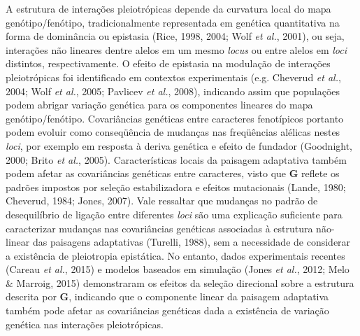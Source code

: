 \documentclass[12pt,twoside]{report}
\begin{document}
A estrutura de interações pleiotrópicas depende da curvatura local do
mapa genótipo/fenótipo, tradicionalmente representada em genética
quantitativa na forma de dominância ou epistasia (Rice, 1998, 2004; Wolf
\emph{et al.}, 2001), ou seja, interações não lineares dentre alelos em
um mesmo \emph{locus} ou entre alelos em \emph{loci} distintos,
respectivamente. O efeito de epistasia na modulação de interações
pleiotrópicas foi identificado em contextos experimentais (e.g. Cheverud
\emph{et al.}, 2004; Wolf \emph{et al.}, 2005; Pavlicev \emph{et al.},
2008), indicando assim que populações podem abrigar variação genética
para os componentes lineares do mapa genótipo/fenótipo. Covariâncias
genéticas entre caracteres fenotípicos portanto podem evoluir como
conseqüência de mudanças nas freqüências alélicas nestes \emph{loci},
por exemplo em resposta à deriva genética e efeito de fundador
(Goodnight, 2000; Brito \emph{et al.}, 2005). Características locais da
paisagem adaptativa também podem afetar as covariâncias genéticas entre
caracteres, visto que $\mathbf{G}$ reflete os padrões impostos por
seleção estabilizadora e efeitos mutacionais (Lande, 1980; Cheverud,
1984; Jones, 2007). Vale ressaltar que mudanças no padrão de
desequilíbrio de ligação entre diferentes \emph{loci} são uma explicação
suficiente para caracterizar mudanças nas covariâncias genéticas
associadas à estrutura não-linear das paisagens adaptativas (Turelli,
1988), sem a necessidade de considerar a existência de pleiotropia
epistática. No entanto, dados experimentais recentes (Careau \emph{et
al.}, 2015) e modelos baseados em simulação (Jones \emph{et al.}, 2012;
Melo \& Marroig, 2015) demonstraram os efeitos da seleção direcional
sobre a estrutura descrita por $\mathbf{G}$, indicando que o componente
linear da paisagem adaptativa também pode afetar as covariâncias
genéticas dada a existência de variação genética nas interações
pleiotrópicas.
\end{document}
